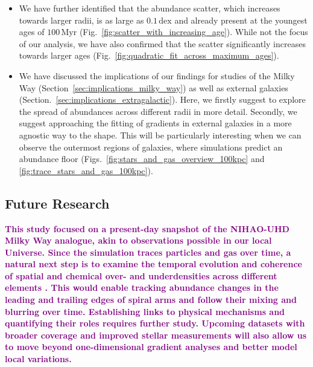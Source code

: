 \documentclass[twocolumn,apj,numberedappendix,appendixfloats,twocolappendix]{openjournal}
\newcommand{\adjusted}[1]{\textbf{\textcolor{purple}{#1}}}
\begin{document}
\begin{CJK*}{UTF8}{gbsn}
\begin{itemize}[left=0.3cm]
    \item We have further identified that the abundance scatter, which increases towards larger radii, is as large as $0.1\,\mathrm{dex}$ and already present at the youngest ages of $100\,\mathrm{Myr}$ (Fig.~\ref{fig:scatter_with_increasing_age}). While not the focus of our analysis, we have also confirmed that the scatter significantly increases towards larger ages (Fig.~\ref{fig:quadratic_fit_across_maximum_ages}).
    \item We have discussed the implications of our findings for studies of the Milky Way (Section~\ref{sec:implications_milky_way}) as well as external galaxies (Section.~\ref{sec:implications_extragalactic}). Here, we firstly suggest to explore the spread of abundances across different radii in more detail. Secondly, we suggest approaching the fitting of gradients in external galaxies in a more agnostic way to the shape. This will be particularly interesting when we can observe the outermost regions of galaxies, where simulations predict an abundance floor (Figs.~\ref{fig:stars_and_gas_overview_100kpc} and \ref{fig:trace_stars_and_gas_100kpc}).
\end{itemize}

\subsection{Future Research} \label{sec:future_research}

\adjusted{This study focused on a present-day snapshot of the NIHAO-UHD Milky Way analogue, akin to observations possible in our local Universe. Since the simulation traces particles and gas over time, a natural next step is to examine the temporal evolution and coherence of spatial and chemical over- and underdensities across different elements \citep[see also][]{Zhang2024}. This would enable tracking abundance changes in the leading and trailing edges of spiral arms and follow their mixing and blurring over time. Establishing links to physical mechanisms and quantifying their roles requires further study. Upcoming datasets with broader coverage and improved stellar measurements \citep[e.g.][]{Barbillon2024} will also allow us to move beyond one-dimensional gradient analyses and better model local variations.}


\end{CJK*}
\end{document}
